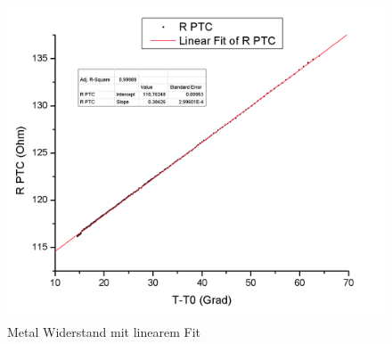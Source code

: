 \documentclass[12pt,a4paper]{article}
\begin{document}
\begin{multicols}{2}

\end{multicols}
\begin{figure}[H]
	\centering
	\includegraphics[scale=0.60]{./figure/RPTC_t_t0.png}
	\caption{Metal Widerstand mit linearem Fit}
	\label{fig:rptc}
\end{figure}
\end{document}
